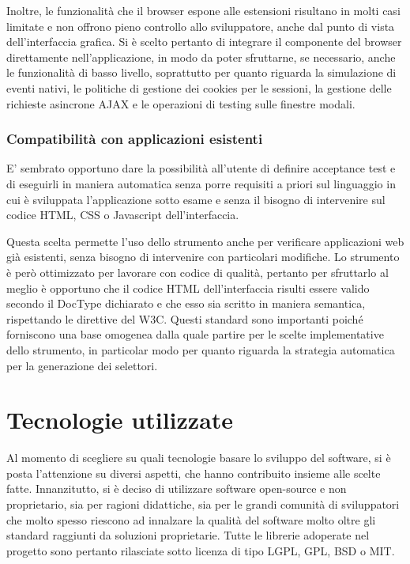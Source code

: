 \documentclass[12pt]{toptesi}
\begin{document}
Inoltre, le funzionalità che il browser espone alle estensioni risultano in molti casi limitate e non offrono pieno controllo allo sviluppatore, anche dal punto di vista dell'interfaccia grafica. Si è scelto pertanto di integrare il componente del browser direttamente nell'applicazione, in modo da poter sfruttarne, se necessario, anche le funzionalità di basso livello, soprattutto per quanto riguarda la simulazione di eventi nativi, le politiche di gestione dei cookies per le sessioni, la gestione delle richieste asincrone AJAX e le operazioni di testing sulle finestre modali. 

\subsection{Compatibilità con applicazioni esistenti}

E' sembrato opportuno dare la possibilità all'utente di definire acceptance test e di eseguirli in maniera automatica senza porre requisiti a priori sul linguaggio in cui è sviluppata l'applicazione sotto esame e senza il bisogno di intervenire sul codice HTML, CSS o Javascript dell'interfaccia. 

Questa scelta permette l'uso dello strumento anche per verificare applicazioni web già esistenti, senza bisogno di intervenire con particolari modifiche. Lo strumento è però ottimizzato per lavorare con codice di qualità, pertanto per sfruttarlo al meglio è opportuno che il codice HTML dell'interfaccia risulti essere valido secondo il DocType dichiarato e che esso sia scritto in maniera semantica, rispettando le direttive del W3C. Questi standard sono importanti poiché forniscono una base omogenea dalla quale partire per le scelte implementative dello strumento, in particolar modo per quanto riguarda la strategia automatica per la generazione dei selettori.

\chapter{Tecnologie utilizzate}

Al momento di scegliere su quali tecnologie basare lo sviluppo del software, si è posta l'attenzione su diversi aspetti, che hanno contribuito insieme alle scelte fatte. Innanzitutto, si è deciso di utilizzare software open-source e non proprietario, sia per ragioni didattiche, sia per le grandi comunità di sviluppatori che molto spesso riescono ad innalzare la qualità del software molto oltre gli standard raggiunti da soluzioni proprietarie. Tutte le librerie adoperate nel progetto sono pertanto rilasciate sotto licenza di tipo LGPL, GPL, BSD o MIT. 
\end{document}
